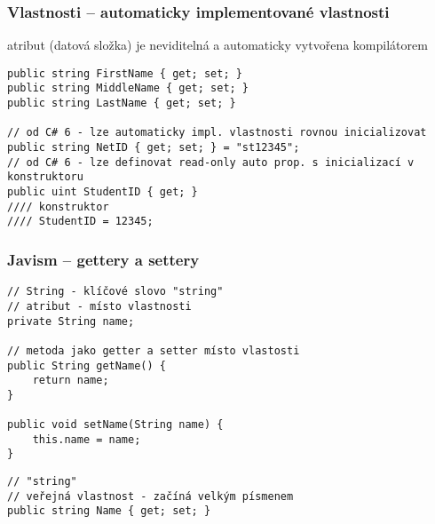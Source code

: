 \begin{frame}[fragile]
\frametitle{Vlastnosti -- automaticky implementované vlastnosti}
\vfill
\begin{bitemize}{}
\item atribut (datová složka) je neviditelná a automaticky vytvořena kompilátorem
\end{bitemize}
\vfill
\begin{yesblock}
\begin{lstlisting}
public string FirstName { get; set; }
public string MiddleName { get; set; }
public string LastName { get; set; }

// od C# 6 - lze automaticky impl. vlastnosti rovnou inicializovat
public string NetID { get; set; } = "st12345";
// od C# 6 - lze definovat read-only auto prop. s inicializací v konstruktoru
public uint StudentID { get; }
//// konstruktor
//// StudentID = 12345;
\end{lstlisting}
\end{yesblock}
\vfill
\end{frame}




\begin{frame}[fragile]
\frametitle{Javism -- gettery a settery}
\vfill
\begin{noblock}
\begin{lstlisting}[basicstyle=\small]
// String - klíčové slovo "string"
// atribut - místo vlastnosti
private String name;

// metoda jako getter a setter místo vlastosti
public String getName() {
    return name;
}

public void setName(String name) {
    this.name = name;
}
\end{lstlisting}
\end{noblock}
\vfill
\begin{yesblock}
\begin{lstlisting}[basicstyle=\small]
// "string"
// veřejná vlastnost - začíná velkým písmenem
public string Name { get; set; }
\end{lstlisting}
\end{yesblock}
\vfill
\end{frame}




